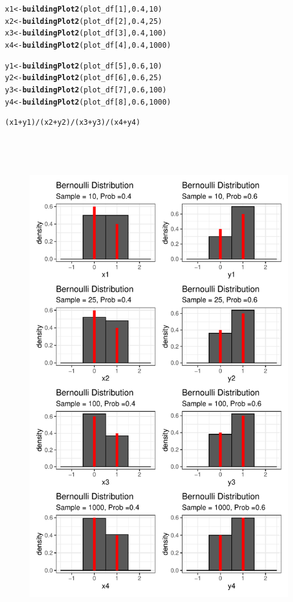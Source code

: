 \documentclass{article}\usepackage[]{graphicx}\usepackage[]{color}
\makeatletter
\newcommand{\hlkwd}[1]{\textcolor[rgb]{0.737,0.353,0.396}{\textbf{#1}}}%
\newenvironment{kframe}{%
 \def\at@end@of@kframe{}%
 \ifinner\ifhmode%
  \def\at@end@of@kframe{\end{minipage}}%
  \begin{minipage}{\columnwidth}%
 \fi\fi%
 \def\FrameCommand##1{\hskip\@totalleftmargin \hskip-\fboxsep
 \colorbox{shadecolor}{##1}\hskip-\fboxsep
     \hskip-\linewidth \hskip-\@totalleftmargin \hskip\columnwidth}%
 \MakeFramed {\advance\hsize-\width
   \@totalleftmargin\z@ \linewidth\hsize
   \@setminipage}}%
 {\par\unskip\endMakeFramed%
 \at@end@of@kframe}
\newenvironment{knitrout}{}{} %
\makeatother
\begin{document}
\begin{enumerate}
\begin{enumerate}
\begin{knitrout}
\begin{kframe}
\begin{alltt}
x1 <- \hlkwd{buildingPlot2}(plot_df[1], 0.4, 10)
x2 <- \hlkwd{buildingPlot2}(plot_df[2], 0.4, 25)
x3 <- \hlkwd{buildingPlot2}(plot_df[3], 0.4, 100)
x4 <- \hlkwd{buildingPlot2}(plot_df[4], 0.4, 1000)

y1 <- \hlkwd{buildingPlot2}(plot_df[5], 0.6, 10)
y2 <- \hlkwd{buildingPlot2}(plot_df[6], 0.6, 25)
y3 <- \hlkwd{buildingPlot2}(plot_df[7], 0.6, 100)
y4 <- \hlkwd{buildingPlot2}(plot_df[8], 0.6, 1000)
		

(x1+y1)/(x2+y2)/(x3+y3)/(x4+y4)
\end{alltt}
\end{kframe}
\end{knitrout}

\begin{figure}[H]
  \begin{center}
  \includegraphics[width=5in, height=8.5in]{figure/histogram.pdf}

\end{center}
\end{figure}
\end{enumerate}
\end{enumerate}
\end{document}
